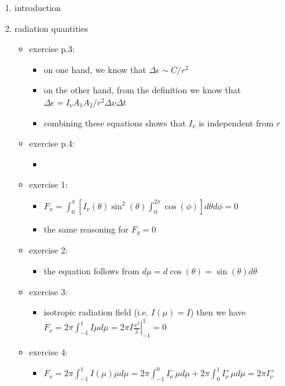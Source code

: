 \documentclass[../main/main.tex]{subfiles}
\begin{document}
\begin{enumerate}
\item introduction
\item radiation quantities
\begin{itemize}

\item exercise p.3: 
\begin{itemize}
\item on one hand, we know that $\Delta \epsilon \sim C/r^2 $
\item on the other hand, from the definition we know  that $\Delta \epsilon = I_{\nu} A_1 A_2/r^2 \Delta \nu \Delta t$
\item combining these equations shows that $I_{\nu}$ is independent from $r$
\end{itemize}

\item exercise p.4:
\begin{itemize}
\item 
\end{itemize}

\item exercise 1:
\begin{itemize}
\item $F_x =  \int_0^{\pi} \left[ I_{\nu}(\theta)\sin^2(\theta) \int_0^{2 \pi}\cos(\phi) \right] d\theta d \phi = 0 $
\item the same reasoning for $F_y = 0$
\end{itemize}

\item exercise 2:
\begin{itemize}
\item the equation follows from $d\mu = d\cos(\theta) = \sin(\theta) d\theta$
\end{itemize}

\item exercise 3: 
\begin{itemize}
\item isotropic radiation field (i.e. $I(\mu) = I$) then we have $F_{\nu} = 2 \pi  \int_{-1}^{1} I \mu d\mu = 2 \pi I \left. \frac{x^2}{2}\right \rvert_
{-1}^{1} = 0$
\end{itemize}

\item exercise 4:
\begin{itemize}
\item $F_{\nu} = 2 \pi  \int_{-1}^{1} I(\mu) \mu d\mu 
	= 2 \pi  \int_{-1}^{0} I_{\nu}^{-} \mu d\mu 
	+ 2 \pi  \int_{0}^{1} I_{\nu}^{+} \mu d\mu 
	= 2 \pi I_{\nu}^+ $
\end{itemize}


\end{itemize}
\end{enumerate}
\end{document}
